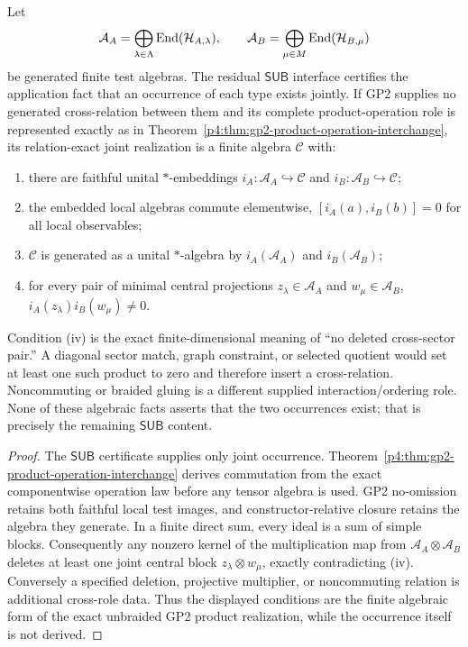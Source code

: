 \documentclass[12pt,a4paper]{article}
\begin{document}
\begin{theorem}
\label{p4:thm:independent-finite-composability}
Let
\[
\mathcal A_A=\bigoplus_{\lambda\in\Lambda}\operatorname{End}(\mathcal H_{A,\lambda}),
\qquad
\mathcal A_B=\bigoplus_{\mu\in M}\operatorname{End}(\mathcal H_{B,\mu})
\]
be generated finite test algebras.  The residual \(\mathsf{SUB}\) interface
certifies the application fact that an occurrence of each type exists jointly.
If GP2 supplies no generated cross-relation between them and its complete
product-operation role is represented exactly as in
Theorem~\ref{p4:thm:gp2-product-operation-interchange}, its relation-exact
joint realization is a finite algebra \(\mathcal C\) with:
\begin{enumerate}[label=(\roman*), leftmargin=2em]
\item there are faithful unital \(*\)-embeddings
      \(i_A:\mathcal A_A\hookrightarrow\mathcal C\) and
      \(i_B:\mathcal A_B\hookrightarrow\mathcal C\);
\item the embedded local algebras commute elementwise,
      \([i_A(a),i_B(b)]=0\) for all local observables;
\item \(\mathcal C\) is generated as a unital \(*\)-algebra by
      \(i_A(\mathcal A_A)\) and \(i_B(\mathcal A_B)\);
\item for every pair of minimal central projections
      \(z_\lambda\in\mathcal A_A\) and \(w_\mu\in\mathcal A_B\),
      \(i_A(z_\lambda)i_B(w_\mu)\ne0\).
\end{enumerate}
Condition (iv) is the exact finite-dimensional meaning of ``no deleted
cross-sector pair.''  A diagonal sector match, graph constraint, or selected
quotient would set at least one such product to zero and therefore insert a
cross-relation.  Noncommuting or braided gluing is a different supplied
interaction/ordering role.  None of these algebraic facts asserts that the two
occurrences exist; that is precisely the remaining \(\mathsf{SUB}\) content.
\end{theorem}


\begin{proof}
The \(\mathsf{SUB}\) certificate supplies only joint occurrence.
Theorem~\ref{p4:thm:gp2-product-operation-interchange} derives
commutation from the exact componentwise operation law before any tensor
algebra is used.  GP2 no-omission retains both faithful local test images, and
constructor-relative closure retains the algebra they generate.  In a finite
direct sum, every ideal is a sum of simple blocks.
Consequently any nonzero kernel of the multiplication map from
\(\mathcal A_A\otimes\mathcal A_B\) deletes at least one joint central block
\(z_\lambda\otimes w_\mu\), exactly contradicting (iv).  Conversely a
specified deletion, projective multiplier, or noncommuting relation is
additional cross-role data.  Thus the displayed conditions are the finite
algebraic form of the exact unbraided GP2 product realization, while the
occurrence itself is not derived.
\end{proof}
\end{document}
